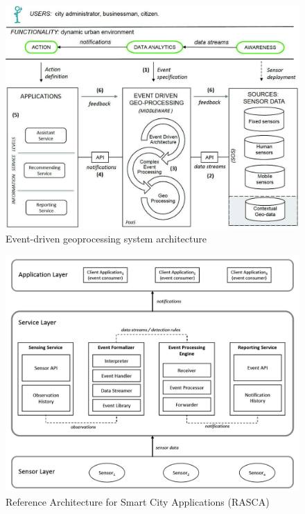 \documentclass[parskip=half]{scrartcl}
\begin{document}
\begin{figure}
	\centering
	\includegraphics[width=\textwidth]{Morales_2015}
	\caption{Event-driven geoprocessing system architecture~\cite[p.~3]{Morales.2015}}
	\label{fig:morales-arch}
\end{figure}

\begin{figure}
	\centering
	\includegraphics[width=\textwidth]{Garcia_2019a}
	\caption{Reference Architecture for Smart City Applications (RASCA)~\cite[p.~12]{GarciaAlvarez.2019}}
	\label{fig:rasca}
\end{figure}
\end{document}
